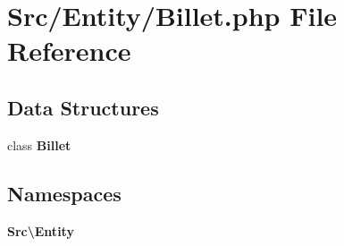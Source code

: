 \section{Src/\+Entity/\+Billet.php File Reference}
\label{_billet_8php}
\subsection*{Data Structures}
\begin{DoxyCompactItemize}
\item 
class \textbf{ Billet}
\end{DoxyCompactItemize}
\subsection*{Namespaces}
\begin{DoxyCompactItemize}
\item 
 \textbf{ Src\textbackslash{}\+Entity}
\end{DoxyCompactItemize}

